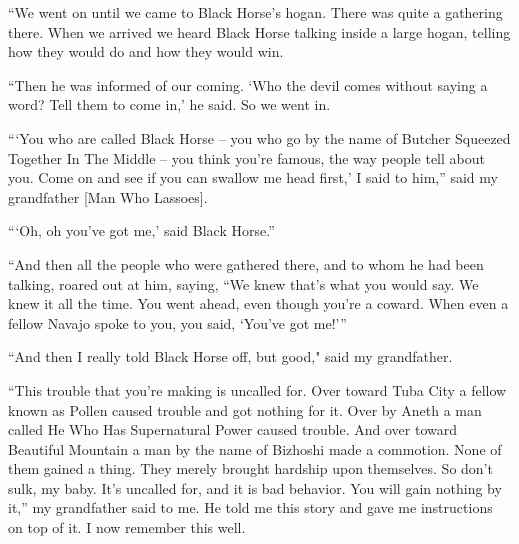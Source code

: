 ``We went on until we came to Black Horse's hogan. There was quite a gathering there. When we arrived we heard Black Horse talking inside a large hogan, telling how they would do and how they would win.

``Then he was informed of our coming. `Who the devil comes without saying a word? Tell them to come in,' he said. So we went in.

{``}`You who are called Black Horse -- you who go by the name of Butcher Squeezed Together In The Middle -- you think you're famous, the way people tell about you. Come on and see if you can swallow me head first,' I said to him,'' said my grandfather [Man Who Lassoes].

{``}`Oh, oh you've got me,' said Black Horse.''

``And then all the people who were gathered there, and to whom he had been talking, roared out at him, saying, ``We knew that's what you would say. We knew it all the time. You went ahead, even though you're a coward. When even a fellow Navajo spoke to you, you said, `You've got me!'{''}


``And then I really told Black Horse off, but good," said my grandfather.

``This trouble that you're making is uncalled for. Over toward Tuba City a fellow known as Pollen caused trouble and got nothing for it. Over by Aneth a man called He Who Has Supernatural Power caused trouble. And over toward Beautiful Mountain a man by the name of Bizhoshi made a commotion. None of them gained a thing. They merely brought hardship upon themselves. So don't sulk, my baby. It's uncalled for, and it is bad behavior. You will gain nothing by it,'' my grandfather said to me. He told me this story and gave me instructions on top of it. I now remember this well.

